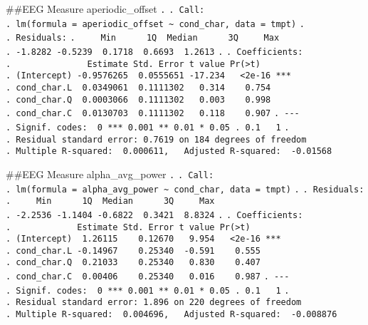 \documentclass[
]{article}
\begin{document}
\#\#EEG Measure aperiodic\_offset \texttt{.} \texttt{.\ Call:}
\texttt{.\ lm(formula\ =\ aperiodic\_offset\ \textasciitilde{}\ cond\_char,\ data\ =\ tmpt)}
\texttt{.} \texttt{.\ Residuals:}
\texttt{.\ \ \ \ \ Min\ \ \ \ \ \ 1Q\ \ Median\ \ \ \ \ \ 3Q\ \ \ \ \ Max}
\texttt{.\ -1.8282\ -0.5239\ \ 0.1718\ \ 0.6693\ \ 1.2613} \texttt{.}
\texttt{.\ Coefficients:}
\texttt{.\ \ \ \ \ \ \ \ \ \ \ \ \ \ \ Estimate\ Std.\ Error\ t\ value\ Pr(\textgreater{}\textbar{}t\textbar{})}
\texttt{.\ (Intercept)\ -0.9576265\ \ 0.0555651\ -17.234\ \ \ \textless{}2e-16\ ***}
\texttt{.\ cond\_char.L\ \ 0.0349061\ \ 0.1111302\ \ \ 0.314\ \ \ \ 0.754}
\texttt{.\ cond\_char.Q\ \ 0.0003066\ \ 0.1111302\ \ \ 0.003\ \ \ \ 0.998}
\texttt{.\ cond\_char.C\ \ 0.0130703\ \ 0.1111302\ \ \ 0.118\ \ \ \ 0.907}
\texttt{.\ -\/-\/-}
\texttt{.\ Signif.\ codes:\ \ 0\ \textquotesingle{}***\textquotesingle{}\ 0.001\ \textquotesingle{}**\textquotesingle{}\ 0.01\ \textquotesingle{}*\textquotesingle{}\ 0.05\ \textquotesingle{}.\textquotesingle{}\ 0.1\ \textquotesingle{}\ \textquotesingle{}\ 1}
\texttt{.}
\texttt{.\ Residual\ standard\ error:\ 0.7619\ on\ 184\ degrees\ of\ freedom}
\texttt{.\ Multiple\ R-squared:\ \ 0.000611,\ \ \ Adjusted\ R-squared:\ \ -0.01568}

\#\#EEG Measure alpha\_avg\_power \texttt{.} \texttt{.\ Call:}
\texttt{.\ lm(formula\ =\ alpha\_avg\_power\ \textasciitilde{}\ cond\_char,\ data\ =\ tmpt)}
\texttt{.} \texttt{.\ Residuals:}
\texttt{.\ \ \ \ \ Min\ \ \ \ \ \ 1Q\ \ Median\ \ \ \ \ \ 3Q\ \ \ \ \ Max}
\texttt{.\ -2.2536\ -1.1404\ -0.6822\ \ 0.3421\ \ 8.8324} \texttt{.}
\texttt{.\ Coefficients:}
\texttt{.\ \ \ \ \ \ \ \ \ \ \ \ \ Estimate\ Std.\ Error\ t\ value\ Pr(\textgreater{}\textbar{}t\textbar{})}
\texttt{.\ (Intercept)\ \ 1.26115\ \ \ \ 0.12670\ \ \ 9.954\ \ \ \textless{}2e-16\ ***}
\texttt{.\ cond\_char.L\ -0.14967\ \ \ \ 0.25340\ \ -0.591\ \ \ \ 0.555}
\texttt{.\ cond\_char.Q\ \ 0.21033\ \ \ \ 0.25340\ \ \ 0.830\ \ \ \ 0.407}
\texttt{.\ cond\_char.C\ \ 0.00406\ \ \ \ 0.25340\ \ \ 0.016\ \ \ \ 0.987}
\texttt{.\ -\/-\/-}
\texttt{.\ Signif.\ codes:\ \ 0\ \textquotesingle{}***\textquotesingle{}\ 0.001\ \textquotesingle{}**\textquotesingle{}\ 0.01\ \textquotesingle{}*\textquotesingle{}\ 0.05\ \textquotesingle{}.\textquotesingle{}\ 0.1\ \textquotesingle{}\ \textquotesingle{}\ 1}
\texttt{.}
\texttt{.\ Residual\ standard\ error:\ 1.896\ on\ 220\ degrees\ of\ freedom}
\texttt{.\ Multiple\ R-squared:\ \ 0.004696,\ \ \ Adjusted\ R-squared:\ \ -0.008876}
\end{document}
